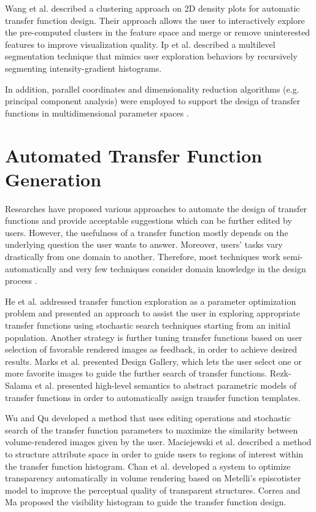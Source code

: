 Wang et al. \cite{wang_automating_2012} described a clustering approach on 2D density plots for automatic transfer function design. Their approach allows the user to interactively explore the pre-computed clusters in the feature space and merge or remove uninterested features to improve visualization quality.
Ip et al. \cite{ip_hierarchical_2012} described a multilevel segmentation technique that mimics user exploration behaviors by recursively segmenting intensity-gradient histograms.

In addition, parallel coordinates and dimensionality reduction algorithms (e.g. principal component analysis) were employed to support the design of transfer functions in multidimensional parameter spaces \cite{zhao_multi-dimensional_2010} \cite{guo_multi-dimensional_2011} \cite{kim_dimensionality_2010}.

\section{Automated Transfer Function Generation}
Researches have proposed various approaches to automate the design of transfer functions and provide acceptable suggestions which can be further edited by users. However, the usefulness of a transfer function mostly depends on the underlying question the user wants to answer. Moreover, users' tasks vary drastically from one domain to another. Therefore, most techniques work semi-automatically and very few techniques consider domain knowledge in the design process \cite{zudilova-seinstra_trends_2008}.

He et al. \cite{he_generation_1996} addressed transfer function exploration as a parameter optimization problem and presented an approach to assist the user in exploring appropriate transfer functions using stochastic search techniques starting from an initial population.
Another strategy is further tuning transfer functions based on user selection of favorable rendered images as feedback, in order to achieve desired results.
Marks et al. \cite{marks_design_1997} presented Design Gallery, which lets the user select one or more favorite images to guide the further search of transfer functions.
Rezk-Salama et al. \cite{rezk-salama_automatic_2000} presented high-level semantics to abstract parametric models of transfer functions in order to automatically assign transfer function templates.

Wu and Qu \cite{wu_interactive_2007} developed a method that uses editing operations and stochastic search of the transfer function parameters to maximize the similarity between volume-rendered images given by the user.
Maciejewski et al. \cite{maciejewski_structuring_2009} described a method to structure attribute space in order to guide users to regions of interest within the transfer function histogram.
Chan et al. \cite{chan_perception-based_2009} developed a system to optimize transparency automatically in volume rendering based on Metelli\rq s episcotister model to improve the perceptual quality of transparent structures.
Correa and Ma \cite{correa_visibility-driven_2009} proposed the visibility histogram to guide the transfer function design.

